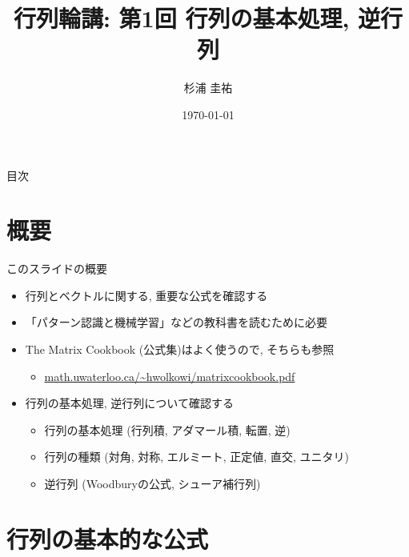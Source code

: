 \documentclass[dvipdfmx,notheorems,t]{beamer}
\title{行列輪講: 第1回 行列の基本処理, 逆行列}
\author{杉浦 圭祐}
\institute[松谷研究室]{慶應義塾大学理工学部情報工学科 松谷研究室}
\date{\today}
\begin{document}
\linespread{1.1}

\frame{\titlepage}

\section{}

\begin{frame}{目次}
\tableofcontents
\end{frame}

\section{概要}

\begin{frame}{このスライドの概要}
\begin{itemize}
  \item 行列とベクトルに関する, 重要な公式を確認する
  \item 「パターン認識と機械学習」などの教科書を読むために必要
  \item The Matrix Cookbook (公式集)はよく使うので, そちらも参照
  \begin{itemize}
    \item \url{math.uwaterloo.ca/~hwolkowi/matrixcookbook.pdf}
  \end{itemize}
  \item 行列の基本処理, 逆行列について確認する
  \begin{itemize}
    \item 行列の基本処理 (行列積, アダマール積, 転置, 逆)
    \item 行列の種類 (対角, 対称, エルミート, 正定値, 直交, ユニタリ)
    \item 逆行列 (Woodburyの公式, シューア補行列)
  \end{itemize}
\end{itemize}
\end{frame}

\section{行列の基本的な公式}
\end{document}
